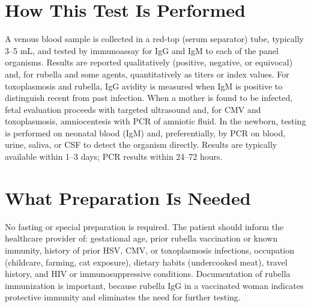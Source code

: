 \section*{How This Test Is Performed}
A venous blood sample is collected in a red-top (serum separator) tube, typically 3--5 mL, and tested by immunoassay for IgG and IgM to each of the panel organisms. Results are reported qualitatively (positive, negative, or equivocal) and, for rubella and some agents, quantitatively as titers or index values. For toxoplasmosis and rubella, IgG avidity is measured when IgM is positive to distinguish recent from past infection. When a mother is found to be infected, fetal evaluation proceeds with targeted ultrasound and, for CMV and toxoplasmosis, amniocentesis with PCR of amniotic fluid. In the newborn, testing is performed on neonatal blood (IgM) and, preferentially, by PCR on blood, urine, saliva, or CSF to detect the organism directly. Results are typically available within 1--3 days; PCR results within 24--72 hours.

\section*{What Preparation Is Needed}
No fasting or special preparation is required. The patient should inform the healthcare provider of: gestational age, prior rubella vaccination or known immunity, history of prior HSV, CMV, or toxoplasmosis infections, occupation (childcare, farming, cat exposure), dietary habits (undercooked meat), travel history, and HIV or immunosuppressive conditions. Documentation of rubella immunization is important, because rubella IgG in a vaccinated woman indicates protective immunity and eliminates the need for further testing.

